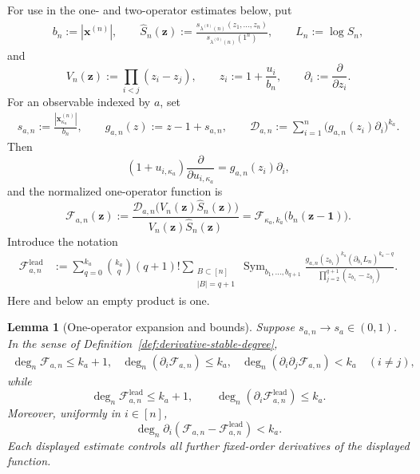 \documentclass[11pt]{amsart}
\theoremstyle{plain}
\newtheorem{lemma}[theorem]{Lemma}
\numberwithin{equation}{section}
\numberwithin{theorem}{section}
\numberwithin{figure}{section}
\begin{document}
For use in the one- and two-operator estimates below, put
\begin{align}
    b_n:=|\mathbf x^{(n)}|,
    \qquad
    \widehat S_n(\mathbf z)
    :=
    \frac{s_{\lambda^{(0)}(n)}(z_1,\ldots,z_n)}
         {s_{\lambda^{(0)}(n)}(1^n)},
    \qquad
    L_n:=\log\widehat S_n,\label{dsnh}
\end{align}
and
\[
    V_n(\mathbf z):=\prod_{i<j}(z_i-z_j),
    \qquad
    z_i:=1+\frac{u_i}{b_n},
    \qquad
    \partial_i:=\frac{\partial}{\partial z_i}.
\]
For an observable indexed by \(a\), set
\begin{align}
    s_{a,n}:=\frac{|\mathbf x^{(n)}_{\kappa_a}|}{b_n},
    \qquad
    g_{a,n}(z):=z-1+s_{a,n},
    \qquad
    \mathscr D_{a,n}
    :=
    \sum_{i=1}^n
    \bigl(g_{a,n}(z_i)\partial_i\bigr)^{k_a}.\label{dsag}
\end{align}
Then
\begin{equation}
    (1+u_{i,\kappa_a})
    \frac{\partial}{\partial u_{i,\kappa_a}}
    =g_{a,n}(z_i)\partial_i,
    \label{eq:affine-euler-change}
\end{equation}
and the normalized one-operator function is
\begin{equation}
    \mathcal F_{a,n}(\mathbf z)
    :=
    \frac{
        \mathscr D_{a,n}
        \bigl(V_n(\mathbf z)\widehat S_n(\mathbf z)\bigr)
    }{
        V_n(\mathbf z)\widehat S_n(\mathbf z)
    }
    =
    \mathcal F_{\kappa_a,k_a}
    \bigl(b_n(\mathbf z-\mathbf1)\bigr).
    \label{eq:affine-one-operator}
\end{equation}
Introduce the notation
\begin{align}
\mathcal F^{\mathrm{lead}}_{a,n}
&:=
\sum_{q=0}^{k_a}\binom{k_a}{q}(q+1)!
\sum_{\substack{B\subset[n]\\ |B|=q+1}}
\operatorname{Sym}_{b_1,\ldots,b_{q+1}}
\frac{
    g_{a,n}(z_{b_1})^{k_a}
    (\partial_{b_1}L_n)^{k_a-q}
}{
    \prod_{j=2}^{q+1}(z_{b_1}-z_{b_j})
}.
\label{eq:correct-inner-leading}
\end{align}
Here and below an empty product is one.

\begin{lemma}[One-operator expansion and bounds]\label{adfd}
Suppose \(s_{a,n}\to s_a\in(0,1)\). In the sense of
Definition~\ref{def:derivative-stable-degree},
\[
\begin{array}{lll}
\deg_n\mathcal F_{a,n}\leq k_a+1,
&\deg_n(\partial_i\mathcal F_{a,n})\leq k_a,
&\deg_n(\partial_i\partial_j\mathcal F_{a,n})<k_a
\quad(i\ne j),
\end{array}
\]
while
\[
    \deg_n\mathcal F^{\mathrm{lead}}_{a,n}\leq k_a+1,
    \qquad
    \deg_n(\partial_i\mathcal F^{\mathrm{lead}}_{a,n})\leq k_a.
\]
Moreover, uniformly in \(i\in[n]\),
\begin{equation}
    \deg_n\partial_i\left(
        \mathcal F_{a,n}-\mathcal F^{\mathrm{lead}}_{a,n}
    \right)<k_a.
    \label{eq:inner-leading-remainder}
\end{equation}
Each displayed estimate controls all further fixed-order derivatives
of the displayed function.
\end{lemma}
\end{document}
